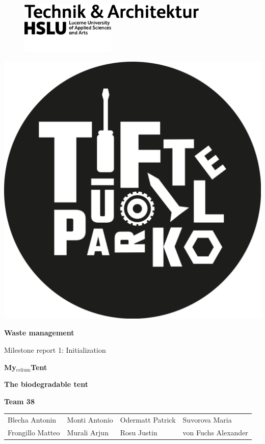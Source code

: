 \documentclass{article}
\begin{document}
\hypersetup{citecolor=black}

\begin{titlepage}
    \begin{figure}
        \hspace*{.01cm}
        \includegraphics[width=.3\textwidth]{media/hslu-logo-2.png}

        \vspace*{.01cm}
        \hspace*{.16cm}\includegraphics[width=0.4\textwidth]{media/hslu-svg-logo.png}
    \end{figure}

    \phantom{}
    \vspace*{-1cm}

    \begin{flushright}
        \includegraphics[width=.225\textwidth]{media/tuefterpark_logo.png}
    \end{flushright}

    \wrapfill

    \vspace*{-3.5cm}
    {\huge \textbf{Waste management}}

    {\Large Milestone report 1: Initialization}

    \vspace*{3cm}
    \begin{center}
        {\Huge \textbf{My$_{\text{celium}}$Tent}}

        \vspace*{.1cm}
        \textbf{\large The biodegradable tent}
    \end{center}

    \vfill
    {\Large \textbf{Team 38}}\\[1em]
    \renewcommand{\arraystretch}{2}
    \begin{tabularx}{\textwidth}{>{\large}p{}>{\large}p{}>{\large}p{}>{\large}p{}}
    Blecha Antonin & Monti Antonio & Odermatt Patrick & Suvorova Maria \\
    Frongillo Matteo & Murali Arjun & Rosu Justin & von Fuchs Alexander
    \end{tabularx}
    \renewcommand{\arraystretch}{1}
    \vspace{.5cm}


\end{titlepage}
\end{document}
